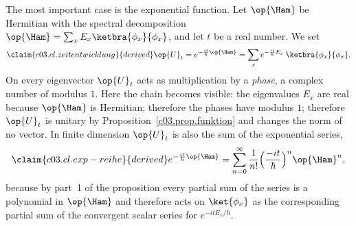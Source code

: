 The most important case is the exponential function. Let $\op{\Ham}$ be Hermitian with the
spectral decomposition $\op{\Ham} = \sum_x E_x \ketbra{\phi_x}{\phi_x}$, and let $t$ be a real
number. We set
\begin{equation}\label{c03.eq.zeitentwicklung}\claim{c03.cl.zeitentwicklung}{derived}
  \op{U}_t = e^{-\frac{i t}{\hbar}\op{\Ham}}
  = \sum_{x} e^{-\frac{i t}{\hbar} E_x}\, \ketbra{\phi_x}{\phi_x} .
\end{equation}
On every eigenvector $\op{U}_t$ acts as multiplication by a \emph{phase}, a complex number of
modulus $1$. Here the chain becomes visible: the eigenvalues $E_x$ are real because $\op{\Ham}$ is
Hermitian; therefore the phases have modulus $1$; therefore $\op{U}_t$ is unitary by
Proposition~\ref{c03.prop.funktion} and changes the norm of no vector. In finite dimension
$\op{U}_t$ is also the sum of the exponential series,
\begin{equation}\label{c03.eq.exp-reihe}\claim{c03.cl.exp-reihe}{derived}
  e^{-\frac{i t}{\hbar}\op{\Ham}} = \sum_{n=0}^{\infty} \frac{1}{n!}\Bigl(\frac{-i t}{\hbar}\Bigr)^{n} \op{\Ham}^n ,
\end{equation}
because by part~1 of the proposition every partial sum of the series is a polynomial in
$\op{\Ham}$ and therefore acts on $\ket{\phi_x}$ as the corresponding partial sum of the
convergent scalar series for $e^{-i t E_x/\hbar}$.

